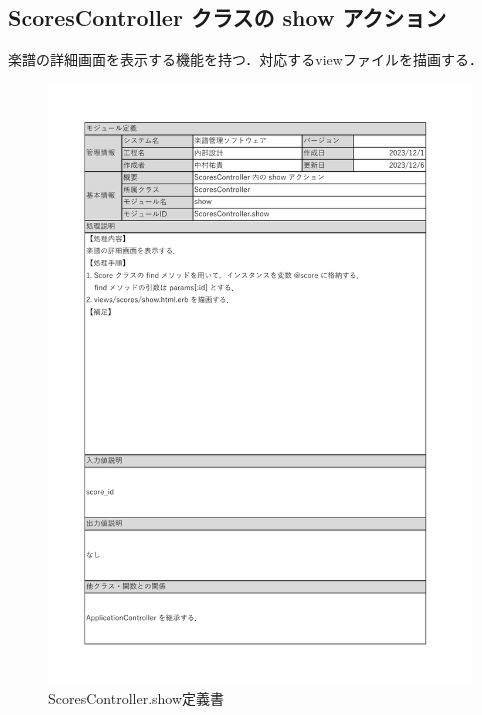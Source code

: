 \subsection*{ScoresController クラスの show アクション}
楽譜の詳細画面を表示する機能を持つ．対応するviewファイルを描画する．
\begin{figure}[H]
	\centering
	\includegraphics[scale=0.6]{img/Scores/xlsx/ScoresController_show.pdf}
	\vspace{-1cm}
	\caption{ScoresController.show定義書}
\end{figure}
